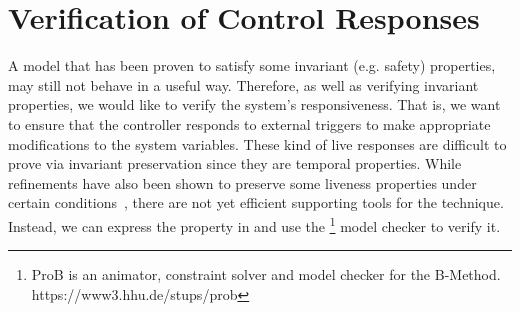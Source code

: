 

\section{Verification of Control Responses}
\label{sec:verificationResponses}

A model that has been proven to satisfy some invariant (e.g. safety) properties, may still not behave in a useful way.
Therefore, as well as verifying invariant properties, we would like to verify the system's responsiveness.  
That is, we want to ensure that the controller responds to external triggers to make appropriate modifications to the system variables. 
These kind of live responses are difficult to prove via invariant preservation since they are temporal properties. 
While \EventB refinements have also been shown to preserve some liveness properties under certain conditions~\cite{hoang2016ltl}, there are not yet efficient supporting tools for the technique.
Instead, we can express the property in \LTL  and use the \PROB\footnote{ProB is an animator, constraint solver and model checker for the B-Method. https://www3.hhu.de/stups/prob} model checker to verify it.

